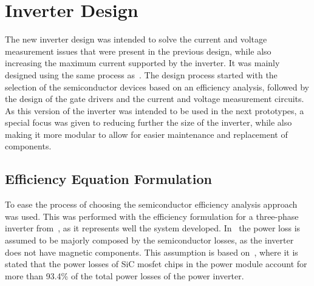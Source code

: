 \chapter{Inverter Design}
\label{chapter:appendix_inverter}

The new inverter design was intended to solve the current and voltage measurement issues that were present in the previous design, while also increasing the maximum current supported by the inverter. It was mainly designed using the same process as~\cite{Costa:MSc}. The design process started with the selection of the semiconductor devices based on an efficiency analysis, followed by the design of the gate drivers and the current and voltage measurement circuits. As this version of the inverter was intended to be used in the next prototypes, a special focus was given to reducing further the size of the inverter, while also making it more modular to allow for easier maintenance and replacement of components.

\section{Efficiency Equation Formulation}

To ease the process of choosing the semiconductor efficiency analysis approach was used. This was performed with the efficiency formulation for a three-phase inverter from~\cite{Costa:SiC_MOSFET_losses:2023}, as it represents well the system developed. In~\cite{Costa:SiC_MOSFET_losses:2023} the power loss is assumed to be majorly composed by the semiconductor losses, as the inverter does not have magnetic components. This assumption is based on~\cite{Song:SiC_MOSFET_losses:2019}, where it is stated that the power losses of SiC \gls{mosfet} chips in the power module account for more than 93.4\% of the total power losses of the power inverter.

